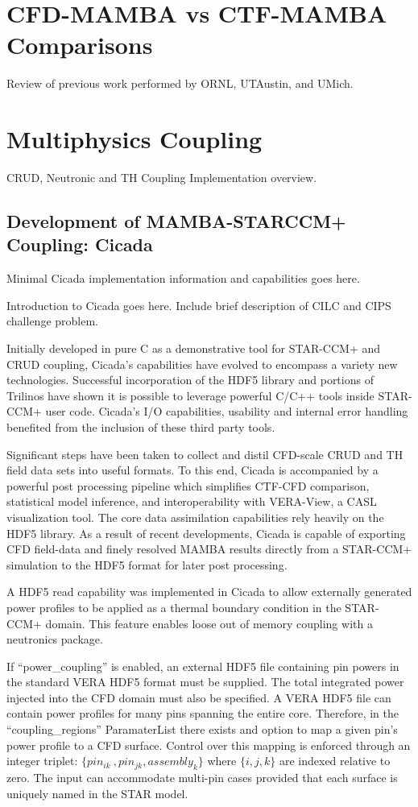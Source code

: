 \documentclass[10pt,a4paper]{report}
\begin{document}
\section{CFD-MAMBA vs CTF-MAMBA Comparisons}

Review of previous work performed by ORNL, UTAustin, and UMich.

\section{Multiphysics Coupling}

CRUD, Neutronic and TH Coupling Implementation overview.

\subsection{Development of MAMBA-STARCCM+ Coupling: Cicada}

Minimal Cicada implementation information and capabilities goes here.

Introduction to Cicada goes here.  Include brief description of CILC and CIPS challenge problem.

Initially developed in pure C as a demonstrative tool for STAR-CCM+ and CRUD coupling, Cicada's capabilities have evolved to encompass a variety new technologies.  Successful incorporation of the HDF5 library and portions of Trilinos have shown it is possible to leverage powerful C/C++ tools inside STAR-CCM+ user code.  Cicada's I/O capabilities, usability and internal error handling benefited from the inclusion of these third party tools.

Significant steps have been taken to collect and distil CFD-scale CRUD and TH field data sets into useful formats.  To this end, Cicada is accompanied by a powerful post processing pipeline which simplifies CTF-CFD comparison, statistical model inference, and interoperability with VERA-View, a CASL visualization tool. The core data assimilation capabilities rely heavily on the HDF5 library.  As a result of recent developments, Cicada is capable of exporting CFD field-data and finely resolved MAMBA results directly from a STAR-CCM+ simulation to the HDF5 format for later post processing.  

A HDF5 read capability was implemented in Cicada to allow externally generated power profiles to be applied as a thermal boundary condition in the STAR-CCM+ domain.  This feature enables loose out of memory coupling with a neutronics package. 

If ``power\_coupling'' is enabled, an external HDF5 file containing pin powers in the standard VERA HDF5 format must be supplied.  The total integrated power injected into the CFD domain must also be specified.  A VERA HDF5 file can contain power profiles for many pins spanning the entire core.  Therefore, in the ``coupling\_regions'' ParamaterList there exists and option to map a given pin's power profile to a CFD surface. Control over this mapping is enforced through an integer triplet:  $\{pin_{ik} \>, pin_{jk}, assembly_k \}$  where $\{i,j,k\}$ are indexed relative to zero.  The input can accommodate multi-pin cases provided that each surface is uniquely named in the STAR model.
\end{document}
